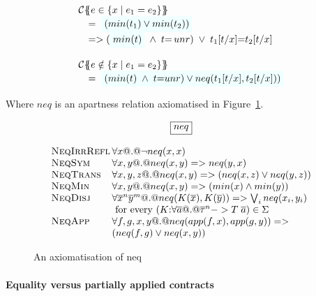 \[\begin{array}{l}
\ctrans{\Sigma}{\Gamma}{e \in \{x \mid e_1 = e_2 \}} \\
\quad = \; \formula{( min(t_1) \lor min(t_2) )} \\ %
\quad => (\formula{min(t)} \; \land \; t{=}\unr) \; \lor \; t_1[t/x]{=}t_2[t/x] \\ \\
\ctrans{\Sigma}{\Gamma}{e \notin \{x \mid e_1 = e_2 \}} \\
\quad = \; \formula{(min(t) \; \land \; t{=}unr) \lor neq(t_1[t/x],t_2[t/x]))}
\end{array}\]

Where $neq$ is an apartness relation axiomatised in Figure~\ref{fig:neq-axioms}.


\begin{figure}
{\small
\[\setlength{\arraycolsep}{1pt}
\begin{array}{c}
 \ruleform{neq} \\ \\
\begin{array}{lll}
 \textsc{NeqIrrRefl} & \forall x @.@ \neg neq(x,x) \\
 \textsc{NeqSym}     & \forall x, y @.@ neq(x,y) => neq(y,x) \\
 \textsc{NeqTrans}   & \forall x, y, z @.@ neq(x,y) => (neq(x,z) \lor neq(y,z)) \\
 \textsc{NeqMin}     & \forall x, y @.@ neq(x,y) => (min(x) \land min(y)) \\
 \textsc{NeqDisj}    & \forall \oln{x}{n}\oln{y}{m} @.@ neq(K(\ol{x}),K(\ol{y})) => \bigvee_i neq(x_i,y_i) \\
                     & \text{ for every } (K{:}\forall\as @.@ \oln{\tau}{n} -> T\;\as) \in \Sigma \\
 \textsc{NeqApp}     & \forall f, g, x, y @.@ neq(app(f,x),app(g,y)) => \\
                     & (neq(f,g) \lor neq(x,y))
\end{array}
\end{array}\]}
\caption{An axiomatisation of neq
    \label{fig:neq-axioms}}
\end{figure}

\paragraph{Equality versus partially applied contracts}

